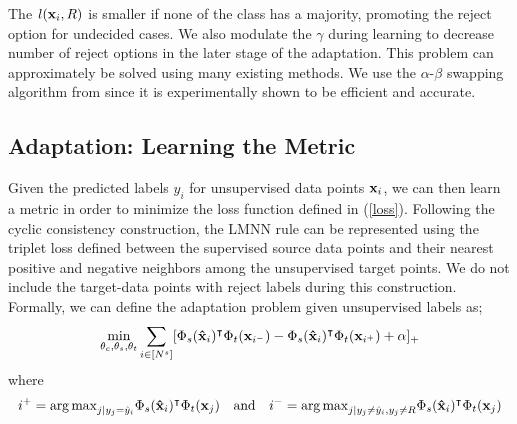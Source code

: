 The $l(\mathbf{x}_i,R)$ is smaller if none of the class has a majority, promoting the reject option for undecided cases. We also modulate the $\gamma$ during learning to decrease number of reject options in the later stage of the adaptation. This problem can approximately be solved using many existing methods. We use the $\alpha$-$\beta$ swapping algorithm from \cite{kolmogrovalphabeta} since it is experimentally shown to be efficient and accurate. %

\subsection{Adaptation: Learning the Metric}
\label{metric}
Given the predicted labels $y_i$ for unsupervised data points $\mathbf{x}_i$, we can then learn a metric in order to minimize the loss function defined in (\ref{loss}). Following the cyclic consistency construction, the LMNN rule can be represented using the triplet loss defined between the supervised source data points and their nearest positive and negative neighbors among the unsupervised target points. We do not include the target-data points with reject labels during this construction. Formally, we can define the adaptation problem given unsupervised labels as;
\begin{equation}
\begin{aligned}
\min_{\theta_c,\theta_s,\theta_t} &\sum_{i \in [N^s]} [\Phi_s(\mathbf{\hat{x}}_i)^\intercal \Phi_t(\mathbf{x}_{i^-}) -\Phi_s(\mathbf{\hat{x}}_i)^\intercal \Phi_t(\mathbf{x}_{i^+}) + \alpha]_{+} \\
\end{aligned}
\end{equation}
where 
\begin{equation}
i^{+} = {\arg\max}_{j | y_j = \hat{y}_i} \Phi_s(\mathbf{\hat{x}}_i)^\intercal \Phi_t(\mathbf{x}_j) \quad  \text{and} \quad   i^{-} = {\arg\max}_{j | y_j \neq \hat{y}_i, y_j \neq R}  \Phi_s(\mathbf{\hat{x}}_i)^\intercal \Phi_t(\mathbf{x}_j)
\label{sup_nn}
\end{equation}


